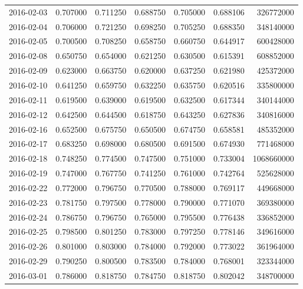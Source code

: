 \begin{tabular}{lrrrrrr}
2016-02-03 &    0.707000 &    0.711250 &    0.688750 &    0.705000 &    0.688106 &   326772000 \\
2016-02-04 &    0.706000 &    0.721250 &    0.698250 &    0.705250 &    0.688350 &   348140000 \\
2016-02-05 &    0.700500 &    0.708250 &    0.658750 &    0.660750 &    0.644917 &   600428000 \\
2016-02-08 &    0.650750 &    0.654000 &    0.621250 &    0.630500 &    0.615391 &   608852000 \\
2016-02-09 &    0.623000 &    0.663750 &    0.620000 &    0.637250 &    0.621980 &   425372000 \\
2016-02-10 &    0.641250 &    0.659750 &    0.632250 &    0.635750 &    0.620516 &   335800000 \\
2016-02-11 &    0.619500 &    0.639000 &    0.619500 &    0.632500 &    0.617344 &   340144000 \\
2016-02-12 &    0.642500 &    0.644500 &    0.618750 &    0.643250 &    0.627836 &   340816000 \\
2016-02-16 &    0.652500 &    0.675750 &    0.650500 &    0.674750 &    0.658581 &   485352000 \\
2016-02-17 &    0.683250 &    0.698000 &    0.680500 &    0.691500 &    0.674930 &   771468000 \\
2016-02-18 &    0.748250 &    0.774500 &    0.747500 &    0.751000 &    0.733004 &  1068660000 \\
2016-02-19 &    0.747000 &    0.767750 &    0.741250 &    0.761000 &    0.742764 &   525628000 \\
2016-02-22 &    0.772000 &    0.796750 &    0.770500 &    0.788000 &    0.769117 &   449668000 \\
2016-02-23 &    0.781750 &    0.797500 &    0.778000 &    0.790000 &    0.771070 &   369380000 \\
2016-02-24 &    0.786750 &    0.796750 &    0.765000 &    0.795500 &    0.776438 &   336852000 \\
2016-02-25 &    0.798500 &    0.801250 &    0.783000 &    0.797250 &    0.778146 &   349616000 \\
2016-02-26 &    0.801000 &    0.803000 &    0.784000 &    0.792000 &    0.773022 &   361964000 \\
2016-02-29 &    0.790250 &    0.800500 &    0.783500 &    0.784000 &    0.768001 &   323344000 \\
2016-03-01 &    0.786000 &    0.818750 &    0.784750 &    0.818750 &    0.802042 &   348700000 \\

\end{tabular}
